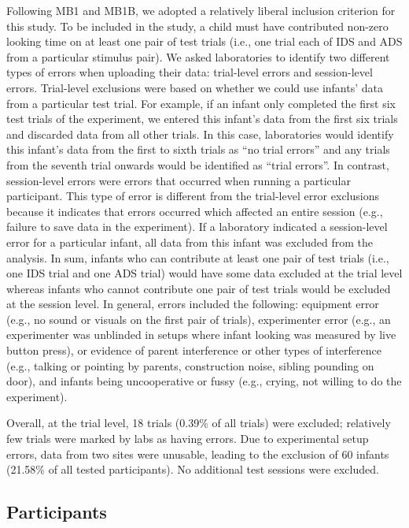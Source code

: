 \documentclass[
  ,man,floatsintext]{apa6}
\begin{document}
Following MB1 and MB1B, we adopted a relatively liberal inclusion criterion for this study. To be included in the study, a child must have contributed non-zero looking time on at least one pair of test trials (i.e., one trial each of IDS and ADS from a particular stimulus pair). We asked laboratories to identify two different types of errors when uploading their data: trial-level errors and session-level errors. Trial-level exclusions were based on whether we could use infants' data from a particular test trial. For example, if an infant only completed the first six test trials of the experiment, we entered this infant's data from the first six trials and discarded data from all other trials. In this case, laboratories would identify this infant's data from the first to sixth trials as ``no trial errors'' and any trials from the seventh trial onwards would be identified as ``trial errors''. In contrast, session-level errors were errors that occurred when running a particular participant. This type of error is different from the trial-level error exclusions because it indicates that errors occurred which affected an entire session (e.g., failure to save data in the experiment). If a laboratory indicated a session-level error for a particular infant, all data from this infant was excluded from the analysis. In sum, infants who can contribute at least one pair of test trials (i.e., one IDS trial and one ADS trial) would have some data excluded at the trial level whereas infants who cannot contribute one pair of test trials would be excluded at the session level. In general, errors included the following: equipment error (e.g., no sound or visuals on the first pair of trials), experimenter error (e.g., an experimenter was unblinded in setups where infant looking was measured by live button press), or evidence of parent interference or other types of interference (e.g., talking or pointing by parents, construction noise, sibling pounding on door), and infants being uncooperative or fussy (e.g., crying, not willing to do the experiment).

Overall, at the trial level, 18 trials (0.39\% of all trials) were excluded; relatively few trials were marked by labs as having errors. Due to experimental setup errors, data from two sites were unusable, leading to the exclusion of 60 infants (21.58\% of all tested participants). No additional test sessions were excluded.

\hypertarget{participants}{%
\subsection{Participants}\label{participants}}
\end{document}
